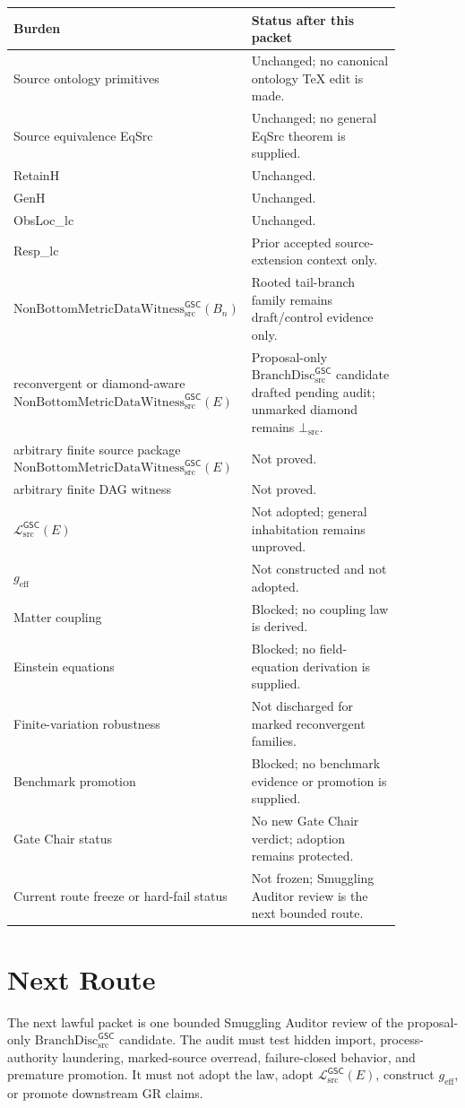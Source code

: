 \documentclass[11pt]{article}
\newcommand{\Witness}{\mathrm{NonBottomMetricDataWitness}_{\mathrm{src}}^{\mathsf{GSC}}}
\newcommand{\MetricData}{\mathcal{L}_{\mathrm{src}}^{\mathsf{GSC}}}
\newcommand{\BottomSrc}{\bot_{\mathrm{src}}}
\newcommand{\geff}{g_{\mathrm{eff}}}
\newcommand{\Bn}{B_n}
\newcommand{\BranchDisc}{\mathrm{BranchDisc}_{\mathrm{src}}^{\mathsf{GSC}}}
\begin{document}
\begin{longtable}{p{0.30\linewidth}p{0.56\linewidth}}
\toprule
Burden & Status after this packet \\
\midrule
Source ontology primitives & Unchanged; no canonical ontology TeX edit is made. \\
Source equivalence EqSrc & Unchanged; no general EqSrc theorem is supplied. \\
RetainH & Unchanged. \\
GenH & Unchanged. \\
ObsLoc\_lc & Unchanged. \\
Resp\_lc & Prior accepted source-extension context only. \\
\(\Witness(\Bn)\) & Rooted tail-branch family remains draft/control evidence only. \\
reconvergent or diamond-aware \(\Witness(E)\) & Proposal-only
\(\BranchDisc\) candidate drafted pending audit; unmarked diamond remains
\(\BottomSrc\). \\
arbitrary finite source package \(\Witness(E)\) & Not proved. \\
arbitrary finite DAG witness & Not proved. \\
\(\MetricData(E)\) & Not adopted; general inhabitation remains unproved. \\
\(\geff\) & Not constructed and not adopted. \\
Matter coupling & Blocked; no coupling law is derived. \\
Einstein equations & Blocked; no field-equation derivation is supplied. \\
Finite-variation robustness & Not discharged for marked reconvergent families. \\
Benchmark promotion & Blocked; no benchmark evidence or promotion is supplied. \\
Gate Chair status & No new Gate Chair verdict; adoption remains protected. \\
Current route freeze or hard-fail status & Not frozen; Smuggling Auditor review
is the next bounded route. \\
\bottomrule
\end{longtable}

\section{Next Route}

The next lawful packet is one bounded Smuggling Auditor review of the
proposal-only \(\BranchDisc\) candidate. The audit must test hidden import,
process-authority laundering, marked-source overread, failure-closed behavior,
and premature promotion. It must not adopt the law, adopt \(\MetricData(E)\),
construct \(\geff\), or promote downstream GR claims.
\end{document}

